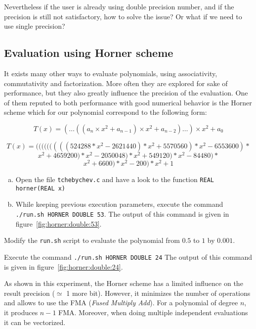 Nevertheless if the user is already using double precision number, and if the precision is still not satisfactory, how to solve the issue? Or what if we need to use single precision?

\FloatBarrier

\subsection{Evaluation using Horner scheme}

It exists many other ways to evaluate polynomials, using associativity, commutativity and factorization. More often they are explored for sake of performance, but they also greatly influence the precision of the evaluation. One of them reputed to both performance with good numerical behavior is the Horner scheme which for our polynomial correspond to the following form:

\[
	T(x) = (\dots((a_n\times x^2 + a_{n-1})\times x^2 + a_{n-2})\dots) \times x^2
    + a_0
\]

$$T(x) = (((((((((524288*x^2-2621440)*x^2+5570560)*x^2-6553600)*$$
$$x^2+4659200)*x^2-2050048)*x^2+549120)*x^2-84480)*$$
$$x^2+6600)*x^2-200)*x^2+1$$

\begin{question}
  \begin{enumerate}[(a)]
  \item Open the file {\tt tchebychev.c} and have a look to the function {\tt REAL horner(REAL x)}
\item While keeping previous execution parameters, execute the command {\tt ./run.sh HORNER DOUBLE 53}.  \newline The output of this command is given in figure~\ref{fig:horner:double:53}.
  \end{enumerate}
\end{question}

\begin{question}
 \item Modify the {\tt run.sh} script to evaluate the polynomial from $0.5$ to $1$ by $0.001$.
\item Execute the command {\tt ./run.sh HORNER DOUBLE 24}  \newline
The output of this command is given in figure~\ref{fig:horner:double:24}.

\end{question}

As shown in this experiment, the Horner scheme has a limited influence on the result precision ($\simeq$ 1 more bit). However, it minimizes the number of operations and allows to use the FMA ({\it Fused Multiply Add}). For a polynomial of degree $n$, it produces $n-1$ FMA. Moreover, when doing multiple independent evaluations it can be vectorized.


